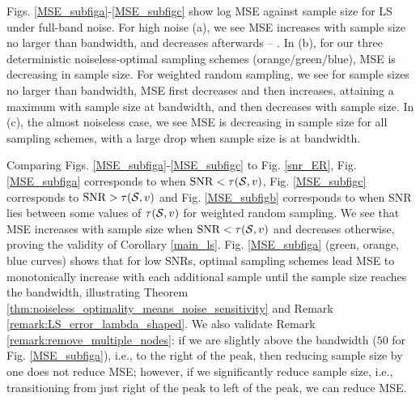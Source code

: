 Figs. \ref{MSE_subfiga}-\ref{MSE_subfigc} show log MSE against sample size for LS under full-band noise. %
    For high noise (a), we see MSE increases with sample size no larger than bandwidth, and decreases afterwards -- . %
    In (b), for our three deterministic noiseless-optimal sampling schemes (orange/green/blue), MSE is decreasing in sample size. For weighted random sampling, we see for sample sizes no larger than bandwidth, MSE first decreases and then increases, attaining a maximum with sample size at bandwidth, and then decreases with sample size.
    In (c), the almost noiseless case, we see MSE is decreasing in sample size for all sampling schemes, with a large drop when sample size is at bandwidth.

Comparing Figs. \ref{MSE_subfiga}-\ref{MSE_subfigc} to Fig. \ref{snr_ER}, Fig. \ref{MSE_subfiga} corresponds to when $\text{SNR} < \tau(\mathcal{S},v)$, Fig. \ref{MSE_subfigc} corresponds to $\text{SNR} > \tau(\mathcal{S},v)$ and Fig. \ref{MSE_subfigb} corresponds to when SNR lies between some values of $\tau(\mathcal{S},v)$ for weighted random sampling.  
We see that MSE increases with sample size when $\text{SNR} < \tau(\mathcal{S},v)$ and decreases otherwise, proving the validity of Corollary \ref{main_ls}.
Fig. \ref{MSE_subfiga} (green, orange, blue curves) shows that for low SNRs, optimal sampling schemes  lead MSE to monotonically increase with each additional sample until the sample size reaches the bandwidth, illustrating Theorem \ref{thm:noiseless_optimality_means_noise_sensitivity} and Remark \ref{remark:LS_error_lambda_shaped}. We also validate Remark \ref{remark:remove_multiple_nodes}: if we are slightly above the bandwidth ($50$ for Fig. \ref{MSE_subfiga}), i.e., to the right of the peak, then reducing sample size by one does not reduce MSE; however, if we significantly reduce sample size, i.e., transitioning from just right of the peak to left of the peak, we can reduce MSE. %


